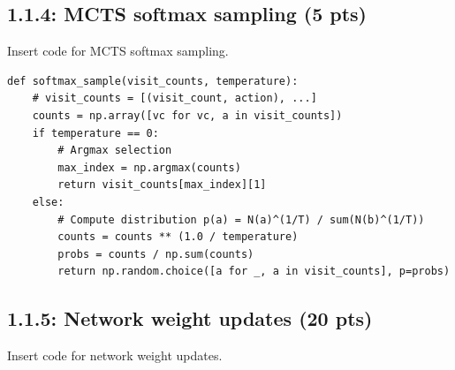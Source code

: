 \documentclass[12pt]{article}
\begin{document}

\subsection*{1.1.4: MCTS softmax sampling (5 pts)}
Insert code for MCTS softmax sampling.

\begin{tcolorbox}[height=22em, width=\textwidth]
\begin{center}
    \begin{verbatim}
def softmax_sample(visit_counts, temperature):
    # visit_counts = [(visit_count, action), ...]
    counts = np.array([vc for vc, a in visit_counts])
    if temperature == 0:
        # Argmax selection
        max_index = np.argmax(counts)
        return visit_counts[max_index][1]
    else:
        # Compute distribution p(a) = N(a)^(1/T) / sum(N(b)^(1/T))
        counts = counts ** (1.0 / temperature)
        probs = counts / np.sum(counts)
        return np.random.choice([a for _, a in visit_counts], p=probs)
    \end{verbatim}
\end{center}
\end{tcolorbox}
\newpage


\subsection*{1.1.5: Network weight updates (20 pts)}
Insert code for network weight updates.
\end{document}
